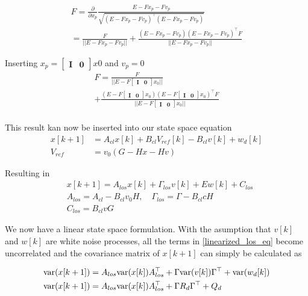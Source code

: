 \begin{align}
    F = \frac{\partial}{\partial x_p} \frac{E-Fx_p-Fv_p}{\sqrt{(E-Fx_p-Fv_p)^\top (E-Fx_p-Fv_p)}} \\
    = \frac{F}{||E-Fx_p-Fv_p||} + \frac{(E-Fx_p-Fv_p)(E-Fx_p-Fv_p)^\top F}{||E-Fx_p-Fv_p||}
\end{align}

Inserting $x_p= \begin{bmatrix}\mathbf{I}  &\mathbf{0}\end{bmatrix}x0$ and $v_p=0$
\begin{multline}
    F= \frac{F}{||E-F  \begin{bmatrix}\mathbf{I}  &\mathbf{0}\end{bmatrix} x_0||} \\+ \frac{(E-F  \begin{bmatrix}\mathbf{I}  &\mathbf{0}\end{bmatrix}x_0)(E-F  \begin{bmatrix}\mathbf{I}  &\mathbf{0}\end{bmatrix}x_0)^\top F}{||E- F \begin{bmatrix}\mathbf{I}  &\mathbf{0}\end{bmatrix}x_0||} \\
\end{multline}

This result kan now be inserted into our state space equation
\begin{align}
 x[k+1] & = A_{cl} x[k] + B_{cl} V_{ref}[k] - B_{cl} v[k] +w_d[k] \\
 V_{ref} & = v_0(G- Hx - Hv)
\end{align}

Resulting in
\begin{align}
 & x[k+1]   = A_{los} x[k] + \Gamma_{los} v[k] + E w[k] + C_{los} \\ \label{linearized_los_eq}
 & A_{los}  = A_{cl} - B_{cl} v_0 H, \quad \Gamma_{los} = \Gamma - B_{cl} c H \\ & C_{los} = B_{cl} v G
\end{align}

We now have a linear state space formulation. With the asumption that $v[k]$ and $w[k]$ are white noise processes, all the terms in \eqref{linearized_los_eq} become uncorrelated and the covariance matrix of $x[k+1]$ can simply be calculated as

\begin{align}
    \textnormal{var}(x[k+1]) &= A_{los} \textnormal{var}(x[k]) A_{los}^\top + \Gamma \textnormal{var}(v[k]) \Gamma^\top + \textnormal{var}(w_d[k])  \\
    \textnormal{var}(x[k+1]) &= A_{los} \textnormal{var}(x[k]) A_{los}^\top + \Gamma R_d \Gamma^\top + Q_d
\end{align}


